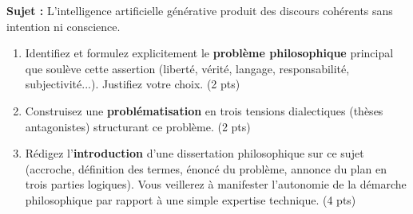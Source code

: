 \documentclass[11pt]{article}
\begin{document}
\begin{exercice}
\textbf{Sujet :} \og L'intelligence artificielle générative produit des discours cohérents sans intention ni conscience. \fg
\begin{enumerate}
    \item Identifiez et formulez explicitement le \textbf{problème philosophique} principal que soulève cette assertion (liberté, vérité, langage, responsabilité, subjectivité...). Justifiez votre choix. (2 pts)
    \item Construisez une \textbf{problématisation} en trois tensions dialectiques (thèses antagonistes) structurant ce problème. (2 pts)
    \item Rédigez l'\textbf{introduction} d'une dissertation philosophique sur ce sujet (accroche, définition des termes, énoncé du problème, annonce du plan en trois parties logiques). Vous veillerez à manifester l'autonomie de la démarche philosophique par rapport à une simple expertise technique. (4 pts)
\end{enumerate}
\end{exercice}
\end{document}
